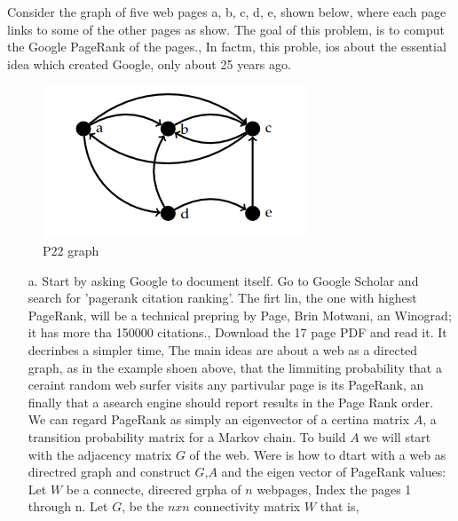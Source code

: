 \documentclass[12pt]{article}
\makeatletter
\theoremstyle{homework}
\newenvironment{exercise}[1]
{\def\@currentlabel{#1}\exercisecore}
{\endexercisecore}
\makeatother
\begin{document}
\begin{exercise}{P22} Consider the graph of five web pages a, b, c, d, e, shown below, where each page links to some of the other pages as show. The goal 
  of this problem, is to comput the Google PageRank of the pages., In factm, this proble, ios about the essential idea which 
  created Google, only about 25 years ago. 
  \begin{figure}[H]
    \begin{center}
      \caption{P22 graph}
       \includegraphics[width=.90\textwidth]{fig1.png}
    \end{center}
  \end{figure}
\begin{enumerate}
  \item[a.] Start by asking Google to document itself. Go to Google Scholar and search for 'pagerank citation ranking'. The firt lin, the one with highest PageRank, will be 
  a technical prepring by Page, Brin Motwani, an Winograd; it has more tha 150000 citations., Download the 17 page PDF and read it. It decrinbes a simpler time, The main ideas are about a 
  web as a directed graph, as in the example shoen above, that the limmiting probability that a ceraint random web surfer visits any partivular page is its PageRank, an finally that a 
  asearch engine should report results in the Page Rank order. We can regard PageRank as simply an eigenvector of a certina matrix $A$, a  transition probability matrix for a Markov chain. To 
  build $A$ we will start with the adjacency matrix $G$ of the web. Were is how to dtart with a web as directred graph and construct $G$,$A$ and the eigen vector of PageRank values: \\
  Let $W$ be a connecte, direcred grpha of $n$ webpages, Index the pages 1 through n. Let $G$, be the $nxn$ connectivity matrix $W$ that is, 
  \begin{equation*}
    

\end{equation*}
\end{enumerate}
\end{exercise}
\end{document}
